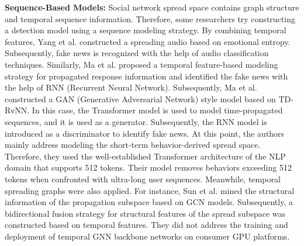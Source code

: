 \par \textbf{Sequence-Based Models:} Social network spread space contains graph structure and temporal sequence information. Therefore, some researchers try constructing a detection model using a sequence modeling strategy. By combining temporal features, Yang et al.\cite{Yang2024Topic} constructed a spreading audio based on emotional entropy. Subsequently, fake news is recognized with the help of audio classification techniques. Similarly, Ma et al.\cite{ma2016detecting} proposed a temporal feature-based modeling strategy for propagated response information and identified the fake news with the help of RNN (Recurrent Neural Network). Subsequently, Ma et al.\cite{ma2021improving} constructed a GAN (Generative Adversarial Network) style model based on TD-RvNN\cite{ma2016detecting}. In this case, the Transformer model is used to model time-propagated sequences, and it is used as a generator. Subsequently, the RNN model is introduced as a discriminator to identify fake news. At this point, the authors mainly address modeling the short-term behavior-derived spread space. Therefore, they used the well-established Transformer architecture of the NLP domain that supports 512 tokens. Their model removes behaviors exceeding 512 tokens when confronted with ultra-long user sequences. Meanwhile, temporal spreading graphs were also applied. For instance, Sun et al.\cite{Sun2022ddgcn} mined the structural information of the propagation subspace based on GCN models. Subsequently, a bidirectional fusion strategy for structural features of the spread subspace was constructed based on temporal features. They did not address the training and deployment of temporal GNN backbone networks on consumer GPU platforms.
